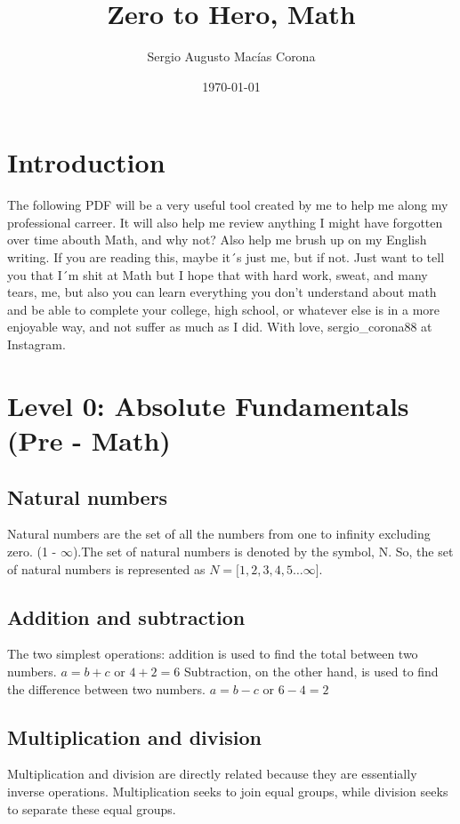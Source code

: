 \documentclass{article} %
\title{Zero to Hero, Math}
\author{Sergio Augusto Macías Corona}
\date{\today} %
\begin{document}
\maketitle

\section{Introduction}

The following PDF will be a very useful tool created by me to help me along my professional carreer. It will also help me review anything I might have forgotten over time abouth Math, and why not? Also help me brush up on my English writing. If you are reading this, maybe it´s just me, but if not. Just want to tell you that I´m shit at Math but I hope that with hard work, sweat, and many tears, me, but also you can learn everything you don't understand about math and be able to complete your college, high school, or whatever else is in a more enjoyable way, and not suffer as much as I did. With love, sergio\_corona88 at Instagram.

\section{Level 0: Absolute Fundamentals (Pre - Math)}
\subsection{Natural numbers}
Natural numbers are the set of all the numbers from one to infinity excluding zero. (1 - $\infty$).The set of natural numbers is denoted by the symbol, N. So, the set of natural numbers is represented as $N = [1,2,3,4,5 \dots \infty$]. 

\subsection{Addition and subtraction}
The two simplest operations: addition is used to find the total between two numbers. $a = b + c$ or $4 + 2 = 6$ Subtraction, on the other hand, is used to find the difference between two numbers. $a = b - c$ or $6 - 4 = 2$

\subsection{Multiplication and division}
Multiplication and division are directly related because they are essentially inverse operations. Multiplication seeks to join equal groups, while division seeks to separate these equal groups.
\end{document}
